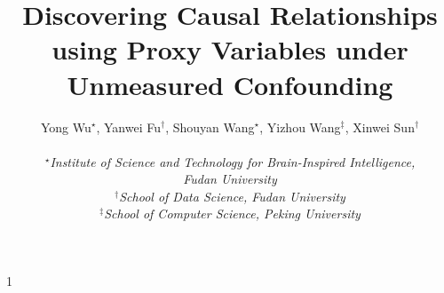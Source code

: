 \documentclass[
  12pt]{article}
\newcommand{\anon}{1}
\begin{document}
\def\spacingset#1{\renewcommand{\baselinestretch}%
{#1}\small\normalsize} \spacingset{1}




\anon
{
  \title{\bf Discovering Causal Relationships using Proxy Variables under Unmeasured Confounding}
  \author{Yong Wu$^\star$, Yanwei Fu$^\dagger$, Shouyan Wang$^\star$, Yizhou Wang$^\ddagger$, Xinwei Sun$^\dagger$\\
    ~\\
    $^\star$\textit{Institute of Science and Technology for Brain-Inspired Intelligence,}\\ \textit{Fudan University} \\
    $^\dagger$\textit{School of Data Science, Fudan University} \\
    $^\ddagger$\textit{School of Computer Science, Peking University}}
  \maketitle
} \fi




\end{document}
